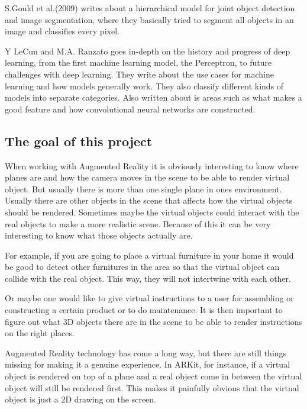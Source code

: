 S.Gould et al.(2009) writes about a hierarchical model for joint object detection and image segmentation, where they basically tried to segment all objects in an image and classifies every pixel. 
\cite{NIPS2009_3766}


Y LeCun and M.A. Ranzato goes in-depth on the history and progress of deep learning, from the first machine learning model, the Perceptron, to future challenges with deep learning. They write about the use cases for machine learning and how models generally work. They also classify different kinds of models into separate categories. Also written about is areas such as what makes a good feature and how convolutional neural networks are constructed.
\cite{deepLearningTutorial}


\subsection{The goal of this project}
\label{subsecGoal}
When working with Augmented Reality it is obviously interesting to know where planes are and how the camera moves in the scene to be able to render virtual object. But usually there is more than one single plane in ones environment. Usually there are other objects in the scene that affects how the virtual objects should be rendered. Sometimes maybe the virtual objects could interact with the real objects to make a more realistic scene. Because of this it can be very interesting to know what those objects actually are.

For example, if you are going to place a virtual furniture in your home it would be good to detect other furnitures in the area so that the virtual object can collide with the real object. This way, they will not intertwine with each other.

Or maybe one would like to give virtual instructions to a user for assembling or constructing a certain product or to do maintenance. It is then important to figure out what 3D objects there are in the scene to be able to render instructions on the right places.

Augmented Reality technology has come a long way, but there are still things missing for making it a genuine experience. In ARKit, for instance, if a virtual object is rendered on top of a plane and a real object come in between the virtual object will still be rendered first. This makes it painfully obvious that the virtual object is just a 2D drawing on the screen.


